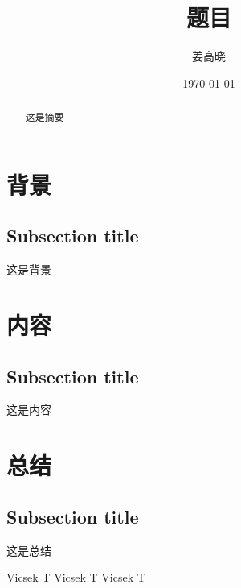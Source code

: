 \documentclass[UTF8]{ctexart}
\begin{document}
\title{题目 }
\author{姜高晓}
\date{\today}
\maketitle
\begin{abstract}
	这是摘要
\end{abstract}

\section{背景}
\subsection{Subsection title}
 	这是背景
\section{内容}
\subsection{Subsection title}
        这是内容
\section{总结}
\subsection{Subsection title}
        这是总结




\begin{thebibliography}{12345}%
 Vicsek T
 Vicsek T
 Vicsek T


\end{thebibliography}
\end{document}
